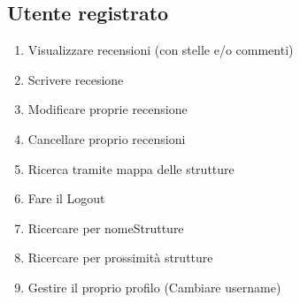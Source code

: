 \documentclass{article}
\begin{document}
 \subsection{Utente registrato} 
 \begin{enumerate}
    \item Visualizzare recensioni (con stelle e/o commenti)
    \item Scrivere recesione
    \item Modificare proprie recensione
    \item Cancellare proprio recensioni
    \item Ricerca tramite mappa delle strutture
    \item Fare il Logout
    \item Ricercare per nomeStrutture 
    \item Ricercare per prossimità strutture 
    \item Gestire il proprio profilo (Cambiare username)
 \end{enumerate}
\end{document}
